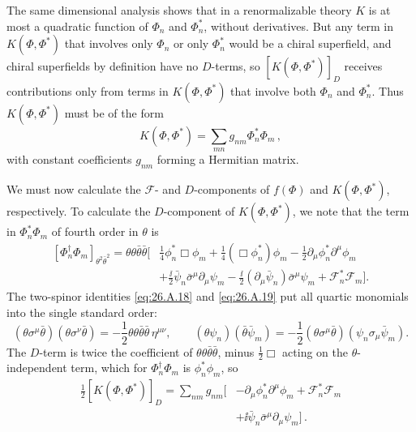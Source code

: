 The same dimensional analysis shows that in a renormalizable theory \(K\) is at
most a quadratic function of \(\Phi_n\) and \(\Phi_n^*\), without derivatives.
But any term in \(K(\Phi,\Phi^*)\) that involves only \(\Phi_n\) or only
\(\Phi_n^*\) would be a chiral superfield, and chiral superfields by definition
have no \(D\)-terms, so \([K(\Phi,\Phi^*)]_D\) receives contributions only from
terms in \(K(\Phi,\Phi^*)\) that involve both \(\Phi_n\) and \(\Phi_n^*\). Thus
\(K(\Phi,\Phi^*)\) must be of the form
\begin{equation}
  K(\Phi,\Phi^*)=\sum_{mn}g_{nm}\Phi_n^*\Phi_m\,,
  \tag{26.4.1}\label{eq:26.4.1}
\end{equation}
with constant coefficients \(g_{nm}\) forming a Hermitian matrix.

We must now calculate the \(\mathcal{F}\)- and \(D\)-components of \(f(\Phi)\)
and \(K(\Phi,\Phi^*)\), respectively. To calculate the \(D\)-component of
\(K(\Phi,\Phi^*)\), we note that the term in \(\Phi_n^*\Phi_m\) of fourth order
in \(\theta\) is
\[
  \begin{aligned}
  [\Phi_n^\dagger\Phi_m]_{\theta^2\bar\theta^2}
  =\theta\theta\bar\theta\bar\theta\biggl[
    &\frac14\phi_n^*\Box\phi_m
    +\frac14(\Box\phi_n^*)\phi_m
    -\frac12\partial_\mu\phi_n^*\partial^\mu\phi_m\\
    &+\frac{\ii}{2}\bar\psi_n\bar\sigma^\mu\partial_\mu\psi_m
    -\frac{\ii}{2}(\partial_\mu\bar\psi_n)\bar\sigma^\mu\psi_m
    +\mathcal F_n^*\mathcal F_m\biggr].
  \end{aligned}
\]
The two-spinor identities \eqref{eq:26.A.18} and
\eqref{eq:26.A.19} put all quartic monomials into the single standard order:
\[
  (\theta\sigma^\mu\bar\theta)
  (\theta\sigma^\nu\bar\theta)
  =-\frac12\theta\theta\bar\theta\bar\theta\,\eta^{\mu\nu},
  \qquad
  (\theta\psi_n)(\bar\theta\bar\psi_m)
  =-\frac12(\theta\sigma^\mu\bar\theta)
    (\psi_n\sigma_\mu\bar\psi_m).
\]
The \(D\)-term is twice the coefficient of
\(\theta\theta\bar\theta\bar\theta\), minus \(\frac12\Box\) acting on the
\(\theta\)-independent term, which for \(\Phi_n^\dagger\Phi_m\) is
\(\phi_n^*\phi_m\), so
\begin{equation}
  \begin{aligned}
  \frac12[K(\Phi,\Phi^*)]_D
  =\sum_{nm}g_{nm}\biggl[
    &-\partial_\mu\phi_n^*\partial^\mu\phi_m
    +\mathcal{F}_n^*\mathcal{F}_m
  \\
    &+\ii\bar\psi_n\bar\sigma^\mu\partial_\mu\psi_m
  \biggr]\,.
  \end{aligned}
  \tag{26.4.2}\label{eq:26.4.2}
\end{equation}
